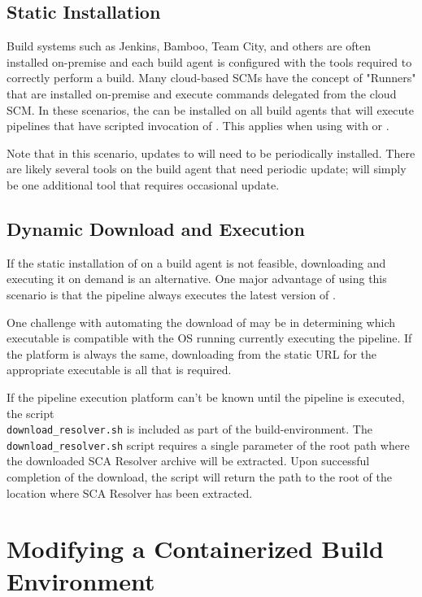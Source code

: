 \subsection{Static Installation}

Build systems such as Jenkins, Bamboo, Team City, and others are 
often installed on-premise and each build agent is configured with the
tools required to correctly perform a build.  Many cloud-based SCMs
have the concept of "Runners" that are installed on-premise and execute
commands delegated from the cloud SCM. In these scenarios, 
the \scaresolver can be installed on all build agents that will execute 
pipelines that have scripted invocation of \scaresolver.  This applies
when using \scaresolver with \cxsca or \cxone.

Note that in this scenario, updates to \scaresolver will need to be
periodically installed.  There are likely several tools on the build agent
that need periodic update; \scaresolver will simply be one additional
tool that requires occasional update.

\subsection{Dynamic Download and Execution}

If the static installation of \scaresolver on a build agent is not
feasible, downloading \scaresolver and executing it on demand is
an alternative.  One major advantage of using this scenario is that
the pipeline always executes the latest version of \scaresolver.

One challenge with automating the download of \scaresolver may be in
determining which \scaresolver executable is compatible with the
OS running currently executing the pipeline.  If the platform is always
the same, downloading \scaresolver from the static URL for
the appropriate executable is all that is required.

If the pipeline execution platform can't be known until the pipeline
is executed, the script\\\texttt{download\_resolver.sh} is included
as part of the build-environment.  The \texttt{download\_resolver.sh}
script requires a single parameter of the root path where the
downloaded SCA Resolver archive will be extracted.  Upon successful
completion of the download, the script will return the path to the root
of the location where SCA Resolver has been extracted.

\section{Modifying a Containerized Build Environment}

